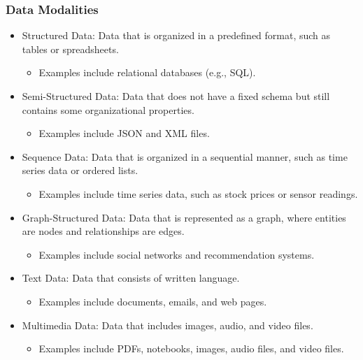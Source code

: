 \documentclass[12pt]{article}
\begin{document}
\subsubsection{Data Modalities}
\begin{itemize}
    \item Structured Data: Data that is organized in a predefined format, such as tables or spreadsheets. 
    \begin{itemize}
        \item Examples include relational databases (e.g., SQL).
    \end{itemize}

    \item Semi-Structured Data: Data that does not have a fixed schema but still contains some organizational properties. 
    \begin{itemize}
        \item Examples include JSON and XML files.
    \end{itemize}

    \item Sequence Data: Data that is organized in a sequential manner, such as time series data or ordered lists.
    \begin{itemize}
        \item Examples include time series data, such as stock prices or sensor readings.
    \end{itemize}

    \item Graph-Structured Data: Data that is represented as a graph, where entities are nodes and relationships are edges. 
    \begin{itemize}
        \item Examples include social networks and recommendation systems.
    \end{itemize}

    \item Text Data: Data that consists of written language.
    \begin{itemize}
        \item Examples include documents, emails, and web pages.
    \end{itemize}

    \item Multimedia Data: Data that includes images, audio, and video files.
    \begin{itemize}
        \item Examples include PDFs, notebooks, images, audio files, and video files.
    \end{itemize}
\end{itemize}
\end{document}
